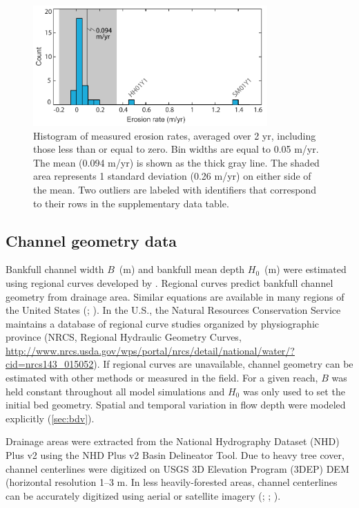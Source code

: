 \documentclass[preprint, review, authoryear, 12pt]{elsarticle}
\begin{document}
\begin{figure}
\centering
\includegraphics[width=0.8\textwidth]{figs/model-erosion-hist.pdf}
\caption{Histogram of measured erosion rates, averaged over 2 yr, including those less than or equal to zero. Bin widths are equal to 0.05 m/yr. The mean (0.094 m/yr) is shown as the thick gray line. The shaded area represents 1 standard deviation (0.26 m/yr) on either side of the mean. Two outliers are labeled with identifiers that correspond to their rows in the supplementary data table.}\label{fig:hist}
\end{figure}

\subsection{Channel geometry data}

Bankfull channel width $B$~(m) and bankfull mean depth $H_0$~(m) were estimated using regional curves developed by \citet{Metcalf2009}. Regional curves predict bankfull channel geometry from drainage area. Similar equations are available in many regions of the United States (\citealp{Faustini2009}; \citealp{Bieger2015}). In the U.S., the Natural Resources Conservation Service maintains a database of regional curve studies organized by physiographic province (NRCS, Regional Hydraulic Geometry Curves, \url{http://www.nrcs.usda.gov/wps/portal/nrcs/detail/national/water/?cid=nrcs143_015052}). If regional curves are unavailable, channel geometry can be estimated with other methods or measured in the field. For a given reach, $B$ was held constant throughout all model simulations and $H_0$ was only used to set the initial bed geometry. Spatial and temporal variation in flow depth were modeled explicitly (\cref{sec:bdv}).

Drainage areas were extracted from the National Hydrography Dataset (NHD) Plus v2 using the NHD Plus v2 Basin Delineator Tool. Due to heavy tree cover, channel centerlines were digitized on USGS 3D Elevation Program (3DEP) DEM (horizontal resolution 1--3 m. In less heavily-forested areas, channel centerlines can be accurately digitized using aerial or satellite imagery (\citealp{Guneralp2007}; \citealp{Guneralp2013}; \citealp{Guneralp2014}). 
\end{document}
